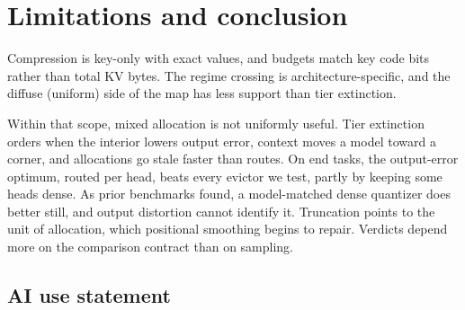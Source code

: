 \documentclass{article}
\newif\ifshowest \showesttrue
\DeclareRobustCommand{\estonly}[1]{\ifshowest#1\else\ifhmode\unskip\fi\fi}
\theoremstyle{definition}
\begin{document}
\section{Limitations and conclusion}
\label{sec:conclusion}

Compression is key-only with exact values, and budgets match key code bits rather than total KV bytes. %
The regime crossing is architecture-specific, and the diffuse (uniform) side of the map has less support than tier extinction.

Within that scope, mixed allocation is not uniformly useful.  Tier extinction orders when the interior lowers output error, context moves a model toward a corner, and allocations go stale faster than routes.
On end tasks, the output-error optimum, routed per head, beats every evictor we test, partly by keeping some heads dense.  As prior benchmarks found, a model-matched dense quantizer does better still, and output distortion cannot identify it.
Truncation points to the unit of allocation, which positional smoothing begins to repair.  Verdicts depend more on the comparison contract than on sampling.

\label{main:end}

\subsection*{AI use statement}
\end{document}
